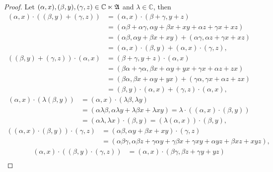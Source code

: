 \begin{proof}
    Let \((\alpha, x), (\beta, y), (\gamma, z) \in \mathbb{C} \ltimes \mathfrak{A}\) and \(\lambda \in \mathbb{C}\), then
    \begin{align*}
        (\alpha, x) \cdot \left((\beta, y) + (\gamma,z)\right)
        &= (\alpha, x) \cdot (\beta + \gamma, y + z)\\
        &= (\alpha \beta + \alpha \gamma, \alpha y + \beta x + xy + \alpha z + \gamma x + xz)\\
        &= (\alpha \beta, \alpha y + \beta x + xy) + (\alpha \gamma, \alpha z + \gamma x + xz)\\
        &= (\alpha, x)\cdot (\beta, y) + (\alpha, x)\cdot(\gamma, z),
    \end{align*}
    \begin{align*}
        \left((\beta, y) + (\gamma,z)\right)\cdot (\alpha, x)
        &= (\beta + \gamma, y + z)\cdot (\alpha, x) \\
        &= (\beta \alpha + \gamma \alpha,  \beta x +\alpha y + yx +  \gamma x + \alpha z +zx)\\
        &= (\beta \alpha,  \beta x + \alpha y +yx) + (\gamma \alpha,  \gamma x +\alpha z + zx)\\
        &= (\beta, y)\cdot (\alpha, x) + (\gamma, z)\cdot(\alpha, x),
    \end{align*}
    \begin{align*}
        (\alpha, x) \cdot \left(\lambda (\beta, y)\right) &= (\alpha, x) \cdot (\lambda \beta, \lambda y)\\
                                                          &= (\alpha \lambda \beta, \alpha \lambda y + \lambda \beta x + \lambda x y) = \lambda \cdot \left((\alpha, x) \cdot (\beta, y)\right)\\
                                                          &= (\alpha \lambda, \lambda x)\cdot (\beta, y) = \left(\lambda (\alpha, x)\right)\cdot (\beta, y),
    \end{align*}
    \begin{align*}
        \left((\alpha,x)\cdot(\beta, y)\right)\cdot (\gamma, z) &= (\alpha \beta, \alpha y + \beta x + xy) \cdot (\gamma, z)\\
                                                                &= (\alpha \beta \gamma, \alpha \beta z + \gamma \alpha y + \gamma \beta x + \gamma xy + \alpha y z + \beta x z + xy z),
    \end{align*}
    \begin{align*}
        (\alpha,x)\cdot\left((\beta, y)\cdot(\gamma, z)\right) &= (\alpha, x) \cdot (\beta \gamma, \beta z + \gamma y + yz)\\

\end{align*}
\end{proof}
